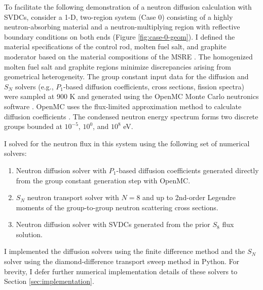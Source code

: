 To facilitate the following demonstration of a neutron diffusion calculation with \glspl{SVDC},
consider a 1-D, two-region system (Case 0) consisting of a highly neutron-absorbing material and a
neutron-multiplying region with reflective boundary conditions on both ends (Figure
\ref{fig:case-0-geom}). I defined the material specifications of the control rod, molten fuel salt,
and graphite moderator based on the material compositions of the \gls{MSRE}
\cite{robertson_msre_1965}. The
homogenized molten fuel salt and graphite regions minimize discrepancies arising from geometrical
heterogeneity. The group constant input data for the diffusion and $S_N$ solvers (e.g., $P_1$-based
diffusion coefficients, cross
sections, fission spectra) were sampled at 900 K and generated using the OpenMC Monte Carlo
neutronics software \cite{romano_openmc:_2015}. OpenMC uses the flux-limited approximation method
to calculate diffusion coefficients \cite{pomraning_flux-limited_1984}. The condensed
neutron energy spectrum forms two discrete groups bounded at $10^{-5}$, $10^0$, and $10^8$ eV.

I solved for the neutron flux in this system using the following set of numerical solvers:
%
\begin{enumerate}
  \item Neutron diffusion solver with $P_1$-based diffusion coefficients generated directly from
    the group constant generation step with OpenMC.
  \item $S_N$ neutron transport solver with $N=8$ and up to 2nd-order Legendre
    moments of the group-to-group neutron scattering cross sections.
  \item Neutron diffusion solver with \glspl{SVDC} generated from the prior $S_8$
    flux solution.
\end{enumerate}
%
I implemented the diffusion solvers using the finite difference method and the $S_N$
solver using the diamond-difference transport sweep method in Python. For
brevity, I defer further numerical implementation details of these solvers to Section
\ref{sec:implementation}.

